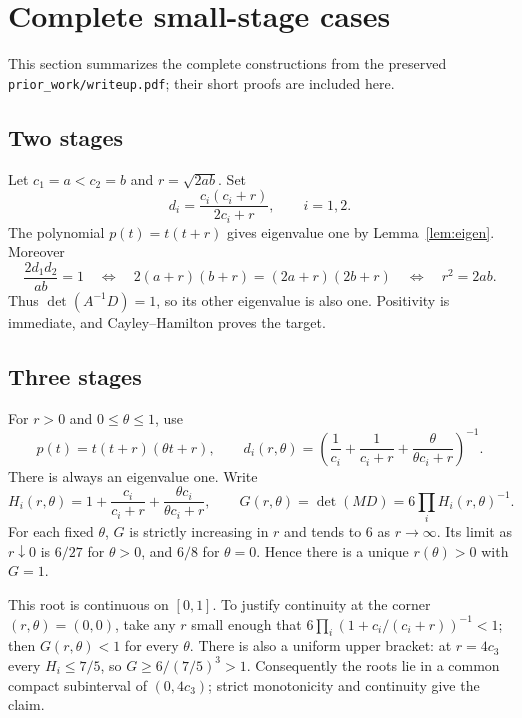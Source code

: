 \documentclass[11pt]{article}
\theoremstyle{remark}\newtheorem{remark}[theorem]{Remark}
\begin{document}
\section{Complete small-stage cases}\label{sec:small}
This section summarizes the complete constructions from the preserved
\texttt{prior\_work/writeup.pdf}; their short proofs are included here.

\subsection{Two stages}
Let $c_1=a<c_2=b$ and $r=\sqrt{2ab}$. Set
\begin{equation}\label{eq:n2}
 d_i=\frac{c_i(c_i+r)}{2c_i+r},\qquad i=1,2.
\end{equation}
The polynomial $p(t)=t(t+r)$ gives eigenvalue one by Lemma~\ref{lem:eigen}.
Moreover
\[
 \frac{2d_1d_2}{ab}=1
 \quad\Longleftrightarrow\quad
 2(a+r)(b+r)=(2a+r)(2b+r)
 \quad\Longleftrightarrow\quad r^2=2ab.
\]
Thus $\det(A^{-1}D)=1$, so its other eigenvalue is also one. Positivity is
immediate, and Cayley--Hamilton proves the target.

\subsection{Three stages}
For $r>0$ and $0\le\theta\le1$, use
\begin{equation}\label{eq:n3ansatz}
 p(t)=t(t+r)(\theta t+r),\qquad
 d_i(r,\theta)=\left(\frac1{c_i}+\frac1{c_i+r}
                         +\frac{\theta}{\theta c_i+r}\right)^{-1}.
\end{equation}
There is always an eigenvalue one. Write
\[
 H_i(r,\theta)=1+\frac{c_i}{c_i+r}
                    +\frac{\theta c_i}{\theta c_i+r},\qquad
 G(r,\theta)=\det(MD)=6\prod_i H_i(r,\theta)^{-1}.
\]
For each fixed $\theta$, $G$ is strictly increasing in $r$ and tends to $6$ as
$r\to\infty$. Its limit as $r\downarrow0$ is $6/27$ for $\theta>0$, and
$6/8$ for $\theta=0$. Hence there is a unique $r(\theta)>0$ with $G=1$.

This root is continuous on $[0,1]$. To justify continuity at the corner
$(r,\theta)=(0,0)$, take any $r$ small enough that
$6\prod_i(1+c_i/(c_i+r))^{-1}<1$; then $G(r,\theta)<1$ for every $\theta$.
There is also a uniform upper bracket: at $r=4c_3$ every $H_i\le7/5$, so
$G\ge6/(7/5)^3>1$. Consequently the roots lie in a common compact subinterval
of $(0,4c_3)$; strict monotonicity and continuity give the claim.
\end{document}
